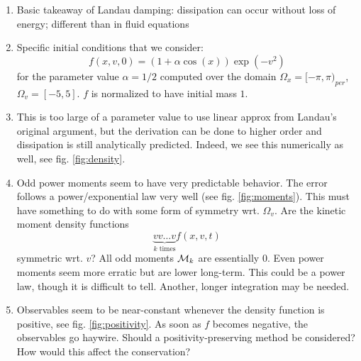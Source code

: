 \iffalse
\begin{figure}
    \missingfigure{}
    \caption{
        Conservation of observables until $f$ becomes negative
    }\label{fig:positivity}
\end{figure}
\fi

\begin{enumerate}
    \item Basic takeaway of Landau damping: dissipation can occur without loss of energy; 
          different than in fluid equations
    \item Specific initial conditions that we consider: 
          \begin{equation}\label{eq:initial_conditions}
            f (x, v, 0) = ( 1 + \alpha \cos (x) ) \exp (- v^2)
          \end{equation}
          for the parameter value $\alpha = 1/2$ computed over the domain 
          $\Omega_x = [ -\pi, \pi )_{per}$, $\Omega_v = [ -5, 5 ]$. $f$ is normalized 
          to have initial mass $1$. 
    \item This is too large of a parameter value to use linear approx from Landau's 
          original argument, but the derivation can be done to higher order and 
          dissipation is still analytically predicted. Indeed, we see this numerically as 
          well, see fig. \ref{fig:density}. 
    \item Odd power moments seem to have very predictable behavior. The error follows a 
          power/exponential law very well (see fig. \ref{fig:moments}). This must have something to 
          do with some form of symmetry wrt. $\Omega_v$. Are the kinetic moment density 
          functions 
          \begin{equation}
            \underbrace{v v \ldots v}_{k\text{ times}} f(x, v, t)
          \end{equation}
          symmetric wrt. $v$? All odd moments $\mathcal{M}_k$ are essentially $0$. Even power 
          moments seem more erratic but are lower long-term. This could be a power law, 
          though it is difficult to tell. Another, longer integration may be needed. 
    \item Observables seem to be near-constant whenever the density function is 
          positive, see fig. \ref{fig:positivity}. As soon as $f$ becomes negative, the 
          observables go haywire. Should a positivity-preserving method be considered? 
          How would this affect the conservation? 
\end{enumerate}

